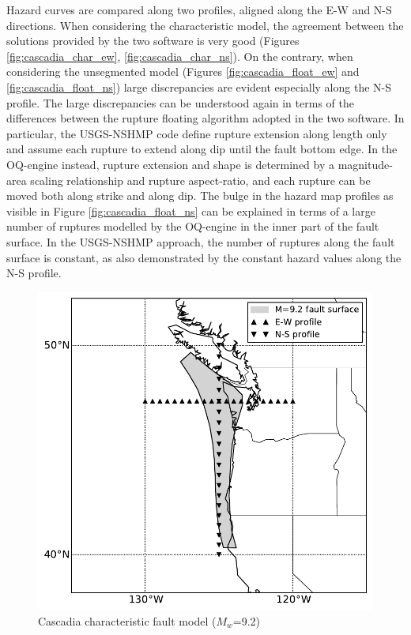 Hazard curves are compared along two profiles, aligned along the E-W and N-S
directions. When considering the characteristic model, the agreement between the
solutions provided by the two software is very good (Figures
\ref{fig:cascadia_char_ew}, \ref{fig:cascadia_char_ns}). On the contrary, when
considering the unsegmented model (Figures \ref{fig:cascadia_float_ew} and
\ref{fig:cascadia_float_ns}) large discrepancies are evident especially along
the N-S profile. The large discrepancies can be understood again in terms of the
differences between the rupture floating algorithm adopted in the two software. 
%
In particular, the USGS-NSHMP code define rupture extension along length only
and assume each rupture to extend along dip until the fault bottom edge. In the
OQ-engine instead, rupture extension and shape is determined by a magnitude-area
scaling relationship and rupture aspect-ratio, and each rupture can be moved
both along strike and along dip. The bulge in the hazard map profiles as visible
in Figure \ref{fig:cascadia_float_ns} can be explained in terms of a large
number of ruptures modelled by the OQ-engine in the inner part of the fault
surface. In the USGS-NSHMP approach, the number of ruptures along the fault
surface is constant, as also demonstrated by the constant hazard values along
the N-S profile.
%
\begin{figure}
\centering
\includegraphics[width=12cm]{./qareport/pictures/cascadia_char.pdf}
\caption{Cascadia characteristic fault model ($M_{w}$=9.2)}
\label{fig:cascadia_geo}
\end{figure}
